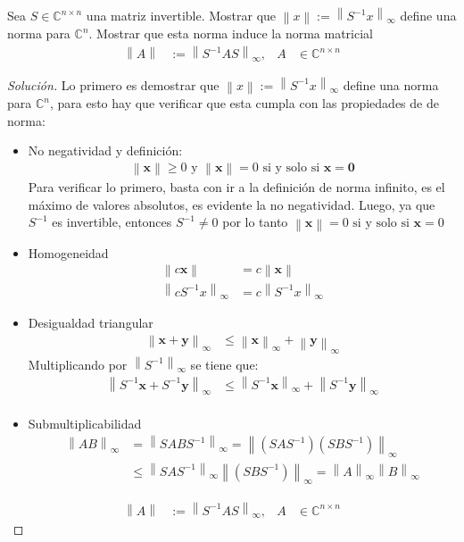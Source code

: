 \documentclass[12pt]{book}
\newcommand{\C}{\mathbb{C}}
\newcommand{\ssi}{\textrm{ si y solo si }}
\newcommand\norm[1]{\left\lVert#1\right\rVert}
\newenvironment{solucion}
  {\renewcommand\qedsymbol{$\square$}\begin{proof}[Solución]}
  {\end{proof}}
\begin{document}
\eje Sea $S\in\C^{n\times n}$ una matriz invertible. Mostrar que $\norm{x}:=\norm{S^{-1}x}_\infty$ define una norma para $\C^n$. Mostrar que esta norma induce la norma matricial
\begin{align*}
    \norm{A}&:=\norm{S^{-1}AS}_\infty, & A&\in\C^{n\times n}
\end{align*}
\begin{solucion}
    Lo primero es demostrar que $\norm{x}:=\norm{S^{-1}x}_\infty$ define una norma para $\C^n$, para esto hay que verificar que esta cumpla con las propiedades de de norma:
    \begin{itemize}
        \item No negatividad y definición:
            \begin{align*}
                \norm{\bm{x}}\geq 0 \textrm{ y } \norm{\bm{x}}=0 \ssi \bm{x}=\bm{0}
            \end{align*}
            Para verificar lo primero, basta con ir a la definición de norma infinito, es el máximo de valores absolutos, es evidente la no negatividad.
            Luego, ya que $S^{-1}$ es invertible, entonces $S^{-1}\neq 0$ por lo tanto  $\norm{\bm{x}}=0 \ssi \bm{x}=0$
        \item Homogeneidad
            \begin{align*}
                \norm{c\bm{x}}&=c\norm{\bm{x}}\\
                \norm{cS^{-1}x}_\infty&=c\norm{S^{-1}x}_\infty
            \end{align*}
        \item Desigualdad triangular
            \begin{align*}
                \norm{\bm{x}+\bm{y}}_\infty&\leq\norm{\bm{x}}_\infty+\norm{\bm{y}}_\infty
            \end{align*}
            Multiplicando por $\norm{S^{-1}}_\infty$ se tiene que:
            \begin{align*}
                \norm{S^{-1}\bm{x}+S^{-1}\bm{y}}_\infty&\leq\norm{S^{-1}\bm{x}}_\infty+\norm{S^{-1}\bm{y}}_\infty\\
           \end{align*}
           \item Submultiplicabilidad
           \begin{align*}
                \norm{AB}_\infty&=\norm{SABS^{-1}}_\infty=\norm{(SAS^{-1})(SBS^{-1})}_\infty \\
                &\leq\norm{SAS^{-1}}_\infty \norm{(SBS^{-1})}_\infty =\norm{A}_\infty\norm{B}_\infty
            \end{align*}
    \end{itemize}
    

    
    \begin{align*}
        \norm{A}&:=\norm{S^{-1}AS}_\infty, & A&\in\C^{n\times n}
\end{align*}
\end{solucion}
\end{document}
